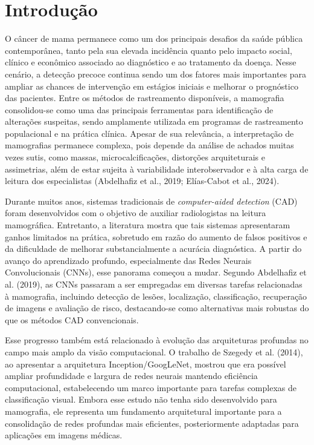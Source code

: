 \section{Introdução}

O câncer de mama permanece como um dos principais desafios da saúde pública contemporânea, tanto pela sua elevada incidência quanto pelo impacto social, clínico e econômico associado ao diagnóstico e ao tratamento da doença. Nesse cenário, a detecção precoce continua sendo um dos fatores mais importantes para ampliar as chances de intervenção em estágios iniciais e melhorar o prognóstico das pacientes. Entre os métodos de rastreamento disponíveis, a mamografia consolidou-se como uma das principais ferramentas para identificação de alterações suspeitas, sendo amplamente utilizada em programas de rastreamento populacional e na prática clínica. Apesar de sua relevância, a interpretação de mamografias permanece complexa, pois depende da análise de achados muitas vezes sutis, como massas, microcalcificações, distorções arquiteturais e assimetrias, além de estar sujeita à variabilidade interobservador e à alta carga de leitura dos especialistas (Abdelhafiz et al., 2019; Elías-Cabot et al., 2024).

Durante muitos anos, sistemas tradicionais de \textit{computer-aided detection} (CAD) foram desenvolvidos com o objetivo de auxiliar radiologistas na leitura mamográfica. Entretanto, a literatura mostra que tais sistemas apresentaram ganhos limitados na prática, sobretudo em razão do aumento de falsos positivos e da dificuldade de melhorar substancialmente a acurácia diagnóstica. A partir do avanço do aprendizado profundo, especialmente das Redes Neurais Convolucionais (CNNs), esse panorama começou a mudar. Segundo Abdelhafiz et al. (2019), as CNNs passaram a ser empregadas em diversas tarefas relacionadas à mamografia, incluindo detecção de lesões, localização, classificação, recuperação de imagens e avaliação de risco, destacando-se como alternativas mais robustas do que os métodos CAD convencionais.

Esse progresso também está relacionado à evolução das arquiteturas profundas no campo mais amplo da visão computacional. O trabalho de Szegedy et al. (2014), ao apresentar a arquitetura Inception/GoogLeNet, mostrou que era possível ampliar profundidade e largura de redes neurais mantendo eficiência computacional, estabelecendo um marco importante para tarefas complexas de classificação visual. Embora esse estudo não tenha sido desenvolvido para mamografia, ele representa um fundamento arquitetural importante para a consolidação de redes profundas mais eficientes, posteriormente adaptadas para aplicações em imagens médicas.

